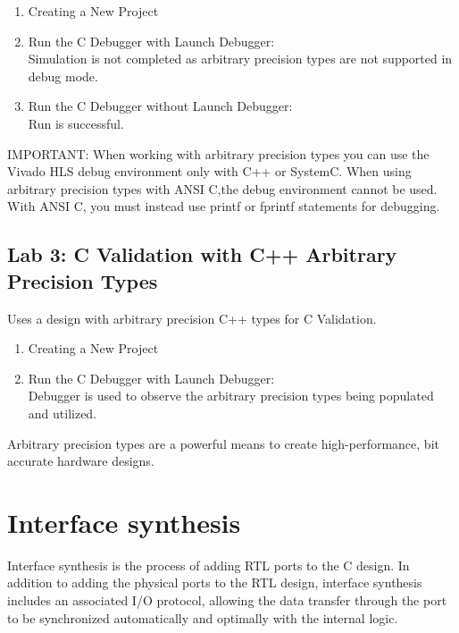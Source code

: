 \begin{enumerate}[label=Step \arabic*:]
    \item Creating a New Project
    \item Run the C Debugger with Launch Debugger:\\ Simulation is not completed as arbitrary precision types are not supported in debug mode.
    \item Run the C Debugger without Launch Debugger:\\ Run is successful.
\end{enumerate}

\begin{highlight}
    IMPORTANT: When working with arbitrary precision types you can use the Vivado HLS debug
    environment only with C++ or SystemC. When using arbitrary precision types with ANSI C,the debug
    environment cannot be used. With ANSI C, you must instead use printf or fprintf statements for
    debugging.    
\end{highlight}
 

\subsection{Lab 3: C Validation with C++ Arbitrary Precision Types}
Uses a design with arbitrary precision C++ types for C Validation.

\begin{enumerate}[label=Step \arabic*:]
    \item Creating a New Project
    \item Run the C Debugger with Launch Debugger:\\ Debugger is used to observe the arbitrary precision types being populated and utilized.
\end{enumerate}

\begin{highlight}
    Arbitrary precision types are a powerful means to create high-performance, bit accurate hardware designs. 
\end{highlight}



\section{Interface synthesis} 
Interface synthesis is the process of adding RTL ports to the C design. In addition to adding the physical ports to the RTL design, interface synthesis includes an associated I/O protocol, allowing the data transfer through the port to be synchronized automatically and optimally with the internal logic.


